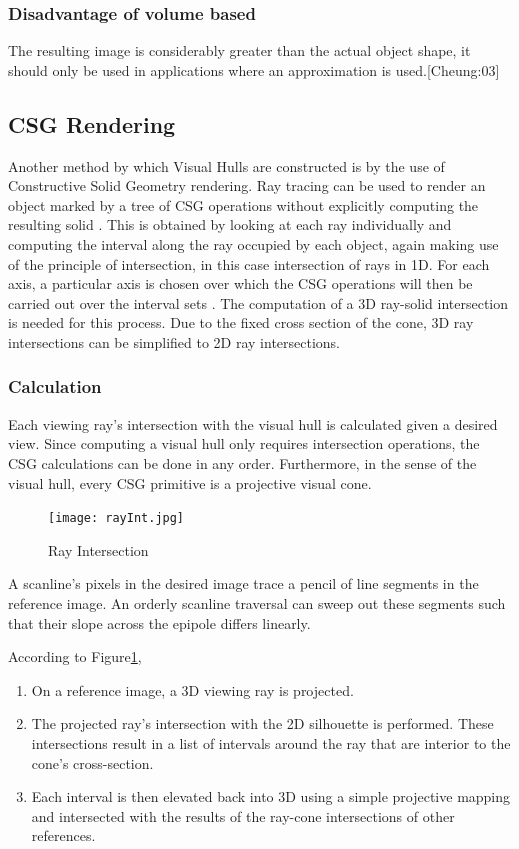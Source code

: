 \documentclass[a4paper]{report}
\begin{document}
\subsubsection{Disadvantage of volume based}
The resulting image is considerably greater than the actual object shape, it should only be used in applications where an approximation is used.[Cheung:03]
\newpage
\subsection{CSG Rendering}
Another method by which Visual Hulls are constructed is by the use of Constructive Solid Geometry rendering. Ray tracing can be used to render an object marked by a tree of CSG operations without explicitly computing the resulting solid \cite{Roth:82}. This is obtained by looking at each ray individually and computing the interval along the ray occupied by each object, again making use of the principle of intersection, in this case intersection of rays in 1D.
For each axis, a particular axis is chosen over which the CSG operations will then be carried out over the interval sets . The computation of a 3D ray-solid intersection is needed for this process. Due to the fixed cross section of the cone, 3D ray intersections can be simplified to 2D ray intersections.


\subsubsection{Calculation}
Each viewing ray's intersection with the visual hull is calculated given a desired view. Since computing a visual hull only requires intersection operations, the CSG calculations can be done in any order. Furthermore, in the sense of the visual hull, every CSG primitive is a projective visual cone.

\begin{figure}[h]
\texttt{[image: rayInt.jpg]} 
\caption{Ray Intersection}
\label{fig:rayInt}
\end{figure}
A scanline's pixels in the desired image trace a pencil of line segments in the reference image. An orderly scanline traversal can sweep out these segments such that their slope across the epipole differs linearly.
\\
\begin{center}
According to Figure\ref{fig:rayInt},

\end{center}\begin{enumerate}
\item On a reference image, a 3D viewing ray is projected.
\item The projected ray's intersection with the 2D silhouette is performed. These intersections result in a list of intervals around the ray that are interior to the cone's cross-section.
\item Each interval is then elevated back into 3D using a simple projective mapping and intersected with the results of the ray-cone intersections of other references.
\end{enumerate}
\end{document}
